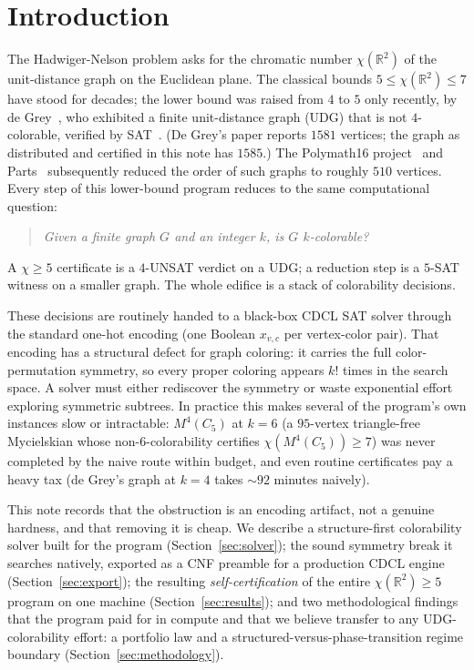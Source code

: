 \documentclass[11pt]{article}
\theoremstyle{definition}
\newcommand{\R}{\mathbb{R}}
\newcommand{\chrom}{\chi}
\begin{document}
\section{Introduction}
\label{sec:intro}

The Hadwiger-Nelson problem asks for the chromatic number $\chrom(\R^2)$ of the
unit-distance graph on the Euclidean plane. The classical bounds
$5 \le \chrom(\R^2) \le 7$ have stood for decades; the lower bound was raised from
$4$ to $5$ only recently, by de Grey~\cite{deGrey2018}, who exhibited a finite
unit-distance graph (UDG) that is not $4$-colorable, verified
by SAT~\cite{Heule2018verify}. (De Grey's paper reports $1581$ vertices; the graph
as distributed and certified in this note has $1585$.) The Polymath16
project~\cite{Polymath16} and
Parts~\cite{Parts2020} subsequently reduced the order of such graphs to roughly
$510$ vertices. Every step of this lower-bound program reduces to the same
computational question:
\begin{quote}
\emph{Given a finite graph $G$ and an integer $k$, is $G$ $k$-colorable?}
\end{quote}
A $\chrom \ge 5$ certificate is a $4$-UNSAT verdict on a UDG; a reduction step is a
$5$-SAT witness on a smaller graph. The whole edifice is a stack of colorability
decisions.

These decisions are routinely handed to a black-box CDCL SAT solver through the
standard one-hot encoding (one Boolean $x_{v,c}$ per vertex-color pair). That
encoding has a structural defect for graph coloring: it carries the full
color-permutation symmetry, so every proper coloring appears $k!$ times in the
search space. A solver must either rediscover the symmetry or waste exponential
effort exploring symmetric subtrees. In practice this makes several of the
program's own instances slow or intractable: $M^4(C_5)$ at $k=6$ (a $95$-vertex
triangle-free Mycielskian whose non-$6$-colorability certifies
$\chrom(M^4(C_5)) \ge 7$) was never completed by the naive route within budget,
and even routine certificates pay a heavy tax (de Grey's graph at $k=4$ takes
$\sim\!92$ minutes naively).

This note records that the obstruction is an encoding artifact, not a genuine
hardness, and that removing it is cheap. We describe a structure-first
colorability solver built for the program (Section~\ref{sec:solver}); the
sound symmetry break it searches natively, exported as a CNF preamble for a
production CDCL engine (Section~\ref{sec:export}); the resulting
\emph{self-certification} of the entire $\chrom(\R^2) \ge 5$ program on one machine
(Section~\ref{sec:results}); and two methodological findings that the program
paid for in compute and that we believe transfer to any UDG-colorability effort:
a portfolio law and a structured-versus-phase-transition regime boundary
(Section~\ref{sec:methodology}).
\end{document}
